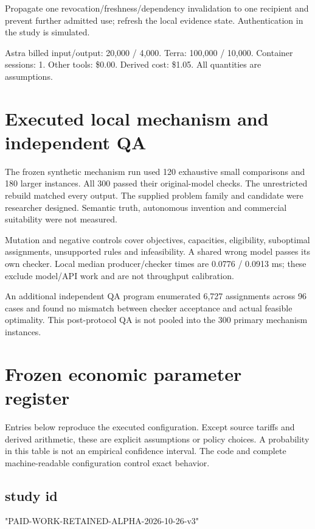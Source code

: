 \documentclass[10pt]{article}
\newcommand{\usd}[1]{\$#1}
\begin{document}
Propagate one revocation/freshness/dependency invalidation to one recipient and prevent further admitted use; refresh the local evidence state. Authentication in the study is simulated.

Astra billed input/output: 20,000 / 4,000. Terra: 100,000 / 10,000. Container sessions: 1. Other tools: \usd{0.00}. Derived cost: \usd{1.05}. All quantities are assumptions.

\section{Executed local mechanism and independent QA}

The frozen synthetic mechanism run used 120 exhaustive small comparisons and 180 larger instances. All 300 passed their original-model checks. The unrestricted rebuild matched every output. The supplied problem family and candidate were researcher designed. Semantic truth, autonomous invention and commercial suitability were not measured.

Mutation and negative controls cover objectives, capacities, eligibility, suboptimal assignments, unsupported rules and infeasibility. A shared wrong model passes its own checker. Local median producer/checker times are 0.0776 / 0.0913 ms; these exclude model/API work and are not throughput calibration.

An additional independent QA program enumerated 6,727 assignments across 96 cases and found no mismatch between checker acceptance and actual feasible optimality. This post-protocol QA is not pooled into the 300 primary mechanism instances.

\clearpage\section{Frozen economic parameter register}

Entries below reproduce the executed configuration. Except source tariffs and derived arithmetic, these are explicit assumptions or policy choices. A probability in this table is not an empirical confidence interval. The code and complete machine-readable configuration control exact behavior.

\subsection*{study id}

"PAID-WORK-RETAINED-ALPHA-2026-10-26-v3"
\end{document}

